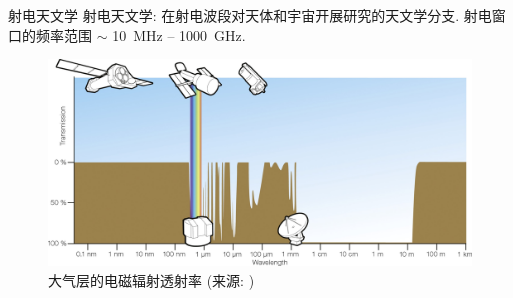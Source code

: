 \documentclass{beamer}
\newcommand{\citeay}[1]{\citeauthor{#1} \citeyear{#1} \parencite{#1}}
\begin{document}
\begin{frame}{射电天文学}
  \alert{射电天文学}:
  在射电波段对天体和宇宙开展研究的天文学分支.
  \alert{射电窗口}的频率范围 $\sim$ \SI{10}{\MHz} -- \SI{1000}{\GHz}.

  \begin{figure}
    \centering
    \includegraphics[width=\textwidth]{atmospheric-em-transmittance}
    \caption{大气层的电磁辐射透射率 (来源: \citeay{condon2016})}
  \end{figure}
\end{frame}
\end{document}
